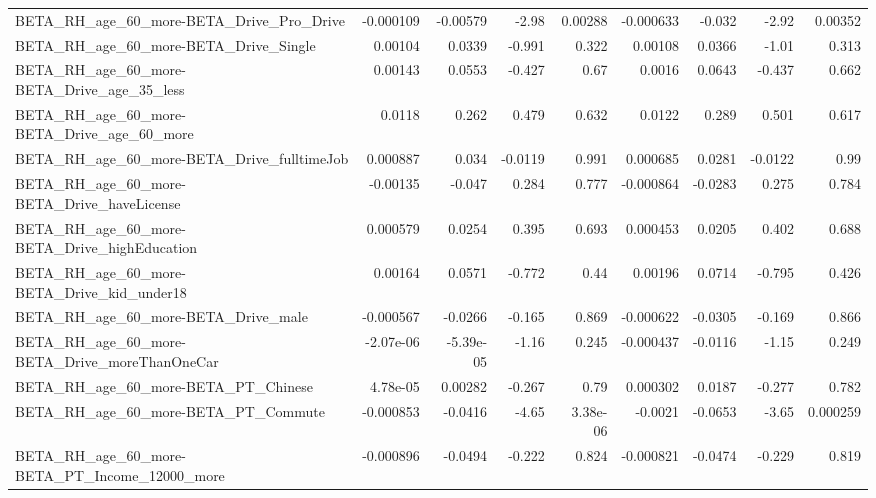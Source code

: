 \begin{tabular}{lrrrrrrrr}
BETA\_RH\_age\_60\_more-BETA\_Drive\_Pro\_Drive           &   -0.000109 &     -0.00579 &    -2.98 &  0.00288 &  -0.000633 &      -0.032 &        -2.92 &       0.00352 \\
BETA\_RH\_age\_60\_more-BETA\_Drive\_Single              &     0.00104 &       0.0339 &   -0.991 &    0.322 &    0.00108 &      0.0366 &        -1.01 &         0.313 \\
BETA\_RH\_age\_60\_more-BETA\_Drive\_age\_35\_less         &     0.00143 &       0.0553 &   -0.427 &     0.67 &     0.0016 &      0.0643 &       -0.437 &         0.662 \\
BETA\_RH\_age\_60\_more-BETA\_Drive\_age\_60\_more         &      0.0118 &        0.262 &    0.479 &    0.632 &     0.0122 &       0.289 &        0.501 &         0.617 \\
BETA\_RH\_age\_60\_more-BETA\_Drive\_fulltimeJob         &    0.000887 &        0.034 &  -0.0119 &    0.991 &   0.000685 &      0.0281 &      -0.0122 &          0.99 \\
BETA\_RH\_age\_60\_more-BETA\_Drive\_haveLicense         &    -0.00135 &       -0.047 &    0.284 &    0.777 &  -0.000864 &     -0.0283 &        0.275 &         0.784 \\
BETA\_RH\_age\_60\_more-BETA\_Drive\_highEducation       &    0.000579 &       0.0254 &    0.395 &    0.693 &   0.000453 &      0.0205 &        0.402 &         0.688 \\
BETA\_RH\_age\_60\_more-BETA\_Drive\_kid\_under18         &     0.00164 &       0.0571 &   -0.772 &     0.44 &    0.00196 &      0.0714 &       -0.795 &         0.426 \\
BETA\_RH\_age\_60\_more-BETA\_Drive\_male                &   -0.000567 &      -0.0266 &   -0.165 &    0.869 &  -0.000622 &     -0.0305 &       -0.169 &         0.866 \\
BETA\_RH\_age\_60\_more-BETA\_Drive\_moreThanOneCar      &   -2.07e-06 &    -5.39e-05 &    -1.16 &    0.245 &  -0.000437 &     -0.0116 &        -1.15 &         0.249 \\
BETA\_RH\_age\_60\_more-BETA\_PT\_Chinese                &    4.78e-05 &      0.00282 &   -0.267 &     0.79 &   0.000302 &      0.0187 &       -0.277 &         0.782 \\
BETA\_RH\_age\_60\_more-BETA\_PT\_Commute                &   -0.000853 &      -0.0416 &    -4.65 & 3.38e-06 &    -0.0021 &     -0.0653 &        -3.65 &      0.000259 \\
BETA\_RH\_age\_60\_more-BETA\_PT\_Income\_12000\_more      &   -0.000896 &      -0.0494 &   -0.222 &    0.824 &  -0.000821 &     -0.0474 &       -0.229 &         0.819 \\

\end{tabular}
